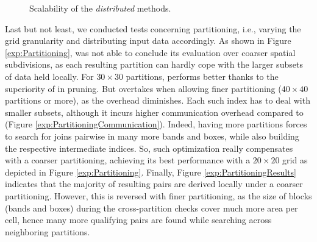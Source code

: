  \begin{figure}[!ht]
 \centering 
 \caption{Scalability of the {\em distributed} methods.}
 \label{exp:scalability}
\end{figure}

Last but not least, we conducted tests concerning partitioning, i.e., varying the grid granularity and distributing input data accordingly. As shown in Figure \ref{exp:Partitioning}, \base was not able to conclude its evaluation over coarser spatial subdivisions, as each resulting partition can hardly cope with the larger subsets of data held locally. For $30 \times 30$ partitions, \opt performs better thanks to  the superiority of \btsr in pruning. But \base overtakes \opt when allowing finer partitioning ($40 \times 40$ partitions or more), as the \rtree overhead diminishes. Each such index has to deal with smaller subsets, although it incurs higher communication overhead compared to \opt (Figure \ref{exp:PartitioningCommunication}). Indeed, having more partitions forces \opt to search for joins pairwise in many more bands and boxes, while also building the respective intermediate indices. So, such optimization really compensates with a coarser partitioning, achieving its best performance with a $20 \times 20$ grid as depicted in Figure \ref{exp:Partitioning}. Finally, Figure \ref{exp:PartitioningResults} indicates that the majority of resulting pairs are derived locally under a coarser partitioning. However, this is reversed with finer partitioning, as the size of blocks (bands and boxes) during the cross-partition checks cover much more area per cell, hence many more qualifying pairs are found while searching across neighboring partitions.


